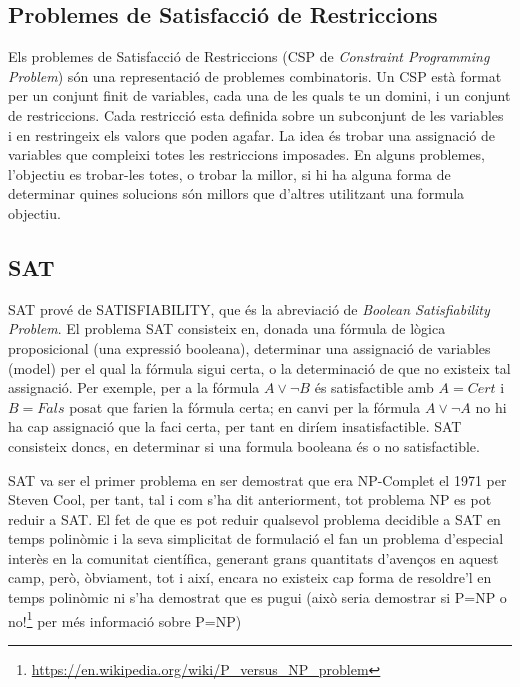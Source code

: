 \documentclass[11pt,a4paper,twoside]{report}
\begin{document}
 

  \subsection{Problemes de Satisfacció de Restriccions}
  
  Els problemes de Satisfacció de Restriccions (CSP de \textit{Constraint Programming Problem}) són una representació de problemes combinatoris. Un CSP està format per un conjunt finit de variables, cada una de les quals te un domini, i un conjunt de restriccions. Cada restricció esta definida sobre un subconjunt de les variables i en restringeix els valors que poden agafar. 
  La idea és trobar una assignació de variables que compleixi totes les restriccions imposades. En alguns problemes, l'objectiu es trobar-les totes, o trobar la millor, si hi ha alguna forma de determinar quines solucions són millors que d'altres utilitzant una formula objectiu.
  
  \subsection{SAT}

  SAT prové de SATISFIABILITY, que és la abreviació de \textit{Boolean Satisfiability Problem}. 
  El problema SAT consisteix en, donada una fórmula de lògica proposicional (una expressió booleana), determinar una assignació de variables (model) per el qual la fórmula sigui certa, o la determinació de que no existeix tal assignació.
  Per exemple, per a la fórmula $A \vee \neg B$ és satisfactible amb $A = Cert$ i $B = Fals$ posat que farien la fórmula certa; en canvi per la fórmula $A \vee \neg A$ no hi ha cap assignació que la faci certa, per tant en diríem insatisfactible. 
  SAT consisteix doncs, en determinar si una formula booleana és o no satisfactible.
  
  SAT va ser el primer problema en ser demostrat que era NP-Complet el 1971 per Steven Cool\cite{cook1971complexity}, per tant, tal i com s'ha dit anteriorment, tot problema NP es pot reduir a SAT.
  El fet de que es pot reduir qualsevol problema decidible a SAT en temps polinòmic i la seva simplicitat de formulació el fan un problema d'especial interès en la comunitat científica, generant grans quantitats d'avenços en aquest camp, 
  però, òbviament, tot i així, encara no existeix cap forma de resoldre'l en temps polinòmic ni s'ha demostrat que es pugui (això seria demostrar si P=NP o no!\footnote{\url{https://en.wikipedia.org/wiki/P_versus_NP_problem}} per més informació sobre P=NP)
  
\end{document}
